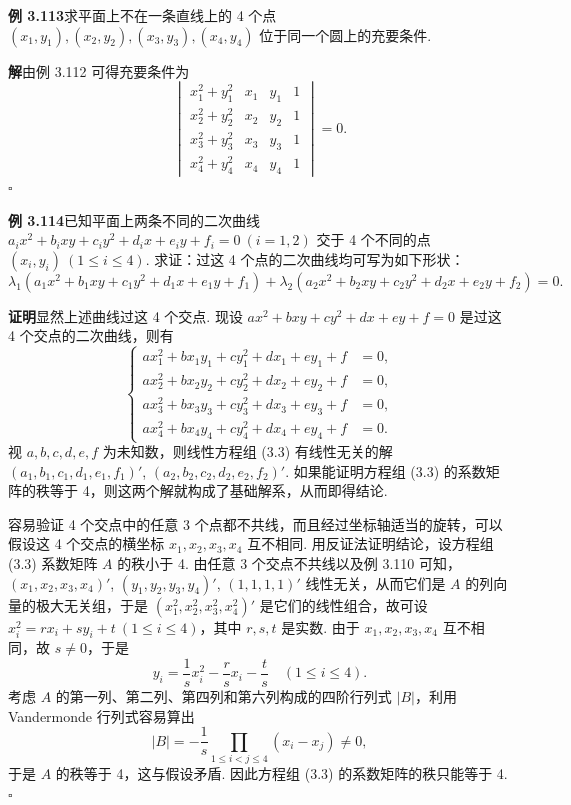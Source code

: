 \documentclass[UTF8, 12pt, fontset=fandol, oneside]{ctexart}
\begin{document}
\noindent\textbf{例 3.113}\quad 求平面上不在一条直线上的 4 个点 $(x_1,y_1),(x_2,y_2),(x_3,y_3),(x_4,y_4)$ 位于同一个圆上的充要条件.

\noindent\textbf{解}\quad 由例 3.112 可得充要条件为
\[
\begin{vmatrix}
x_1^2+y_1^2&x_1&y_1&1\\
x_2^2+y_2^2&x_2&y_2&1\\
x_3^2+y_3^2&x_3&y_3&1\\
x_4^2+y_4^2&x_4&y_4&1
\end{vmatrix}=0.
\]
$\square$

\noindent\textbf{例 3.114}\quad 已知平面上两条不同的二次曲线 $a_ix^2+b_ixy+c_iy^2+d_ix+e_iy+f_i=0\ (i=1,2)$ 交于 4 个不同的点 $(x_i,y_i)\ (1\le i\le 4)$. 求证：过这 4 个点的二次曲线均可写为如下形状：
\[
\lambda_1(a_1x^2+b_1xy+c_1y^2+d_1x+e_1y+f_1)+\lambda_2(a_2x^2+b_2xy+c_2y^2+d_2x+e_2y+f_2)=0.
\]

\noindent\textbf{证明}\quad 显然上述曲线过这 4 个交点. 现设 $ax^2+bxy+cy^2+dx+ey+f=0$ 是过这 4 个交点的二次曲线，则有
\begin{equation}
\left\{
\begin{aligned}
ax_1^2+bx_1y_1+cy_1^2+dx_1+ey_1+f&=0,\\
ax_2^2+bx_2y_2+cy_2^2+dx_2+ey_2+f&=0,\\
ax_3^2+bx_3y_3+cy_3^2+dx_3+ey_3+f&=0,\\
ax_4^2+bx_4y_4+cy_4^2+dx_4+ey_4+f&=0.
\end{aligned}
\right.
\tag{3.3}
\end{equation}
视 $a,b,c,d,e,f$ 为未知数，则线性方程组 (3.3) 有线性无关的解 $(a_1,b_1,c_1,d_1,e_1,f_1)'$, $(a_2,b_2,c_2,d_2,e_2,f_2)'$. 如果能证明方程组 (3.3) 的系数矩阵的秩等于 4，则这两个解就构成了基础解系，从而即得结论.

容易验证 4 个交点中的任意 3 个点都不共线，而且经过坐标轴适当的旋转，可以假设这 4 个交点的横坐标 $x_1,x_2,x_3,x_4$ 互不相同. 用反证法证明结论，设方程组 (3.3) 系数矩阵 $A$ 的秩小于 4. 由任意 3 个交点不共线以及例 3.110 可知，$(x_1,x_2,x_3,x_4)'$, $(y_1,y_2,y_3,y_4)'$, $(1,1,1,1)'$ 线性无关，从而它们是 $A$ 的列向量的极大无关组，于是 $(x_1^2,x_2^2,x_3^2,x_4^2)'$ 是它们的线性组合，故可设 $x_i^2=rx_i+sy_i+t\ (1\le i\le 4)$，其中 $r,s,t$ 是实数. 由于 $x_1,x_2,x_3,x_4$ 互不相同，故 $s\ne 0$，于是
\[
y_i=\frac{1}{s}x_i^2-\frac{r}{s}x_i-\frac{t}{s}\quad (1\le i\le 4).
\]
考虑 $A$ 的第一列、第二列、第四列和第六列构成的四阶行列式 $|B|$，利用 Vandermonde 行列式容易算出
\[
|B|=-\frac{1}{s}\prod_{1\le i<j\le 4}(x_i-x_j)\ne 0,
\]
于是 $A$ 的秩等于 4，这与假设矛盾. 因此方程组 (3.3) 的系数矩阵的秩只能等于 4. $\square$
\end{document}
